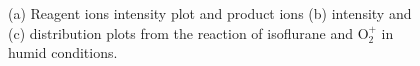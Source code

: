 \begin{figure}%
\centering
{}


\caption{(a) Reagent ions intensity plot and product ions  (b) intensity and (c) distribution plots from the reaction of isoflurane and O$_2^+$ in humid conditions.}
\label{fig:isof_o2_h}
\end{figure}




